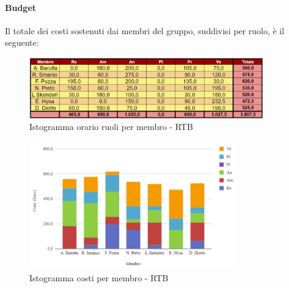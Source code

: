 \paragraph{Budget}
Il totale dei costi sostenuti dai membri del gruppo, suddivisi per ruolo, è il seguente:
\begin{figure}[H]
    \centering
    \includegraphics[width=0.9\textwidth]{../Images/RiepilogoPrezziRTB.png}
    \caption{Istogramma orario ruoli per membro  - RTB}
    \label{fig:CostiRTB}
\end{figure}
\begin{figure}[H]
    \centering
    \includegraphics[width=0.8\textwidth]{../Images/graficoCostoRuoloRTB.png}
    \caption{Istogramma costi per membro  - RTB}
    \label{fig:GraficoCostoRTB}
\end{figure}